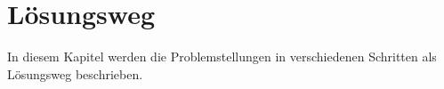 \section{Lösungsweg} \label{sec:projektbericht-loesungsweg}

In diesem Kapitel werden die Problemstellungen in verschiedenen Schritten als Lösungsweg beschrieben.






